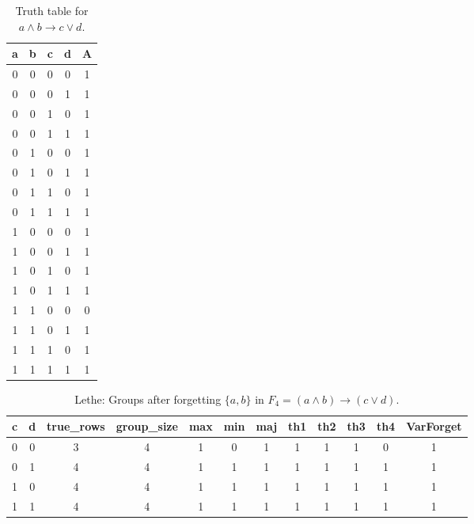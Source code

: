\begin{table}[!tb]
    \centering
    \begin{tabular}{|c|c|c|c|c|}
        \hline
        \textbf{a} & \textbf{b} & \textbf{c} & \textbf{d} & \textbf{A} \\ \hline
        0 & 0 & 0 & 0 & 1 \\ \hline
        0 & 0 & 0 & 1 & 1 \\ \hline
        0 & 0 & 1 & 0 & 1 \\ \hline
        0 & 0 & 1 & 1 & 1 \\ \hline
        0 & 1 & 0 & 0 & 1 \\ \hline
        0 & 1 & 0 & 1 & 1 \\ \hline
        0 & 1 & 1 & 0 & 1 \\ \hline
        0 & 1 & 1 & 1 & 1 \\ \hline
        1 & 0 & 0 & 0 & 1 \\ \hline
        1 & 0 & 0 & 1 & 1 \\ \hline
        1 & 0 & 1 & 0 & 1 \\ \hline
        1 & 0 & 1 & 1 & 1 \\ \hline
        1 & 1 & 0 & 0 & 0 \\ \hline
        1 & 1 & 0 & 1 & 1 \\ \hline
        1 & 1 & 1 & 0 & 1 \\ \hline
        1 & 1 & 1 & 1 & 1 \\ \hline
    \end{tabular}
    \caption{Truth table for $a \land b \rightarrow c \lor d$.}
    \label{tab:truthtab}
\end{table}

\begin{table}[!tb]
    \centering
    \begin{tabular}{|c|c|c|c|c|c|c|c|c|c|c|c|}
        \hline
        \textbf{c} & \textbf{d} & \textbf{true\_rows} & \textbf{group\_size} & \textbf{max} & \textbf{min} & \textbf{maj} & \textbf{th1} & \textbf{th2} & \textbf{th3} & \textbf{th4} & \textbf{VarForget} \\ \hline
        \rowcolor{gray!40} 0 & 0 & 3 & 4 & 1 & 0 & 1 & 1 & 1 & 1 & 0 & 1 \\ \hline
        \rowcolor{blue!40} 0 & 1 & 4 & 4 & 1 & 1 & 1 & 1 & 1 & 1 & 1 & 1 \\ \hline
        \rowcolor{red!40} 1 & 0 & 4 & 4 & 1 & 1 & 1 & 1 & 1 & 1 & 1 & 1 \\ \hline
        \rowcolor{green!40} 1 & 1 & 4 & 4 & 1 & 1 & 1 & 1 & 1 & 1 & 1 & 1 \\ \hline
    \end{tabular}
    \caption{Lethe: Groups after forgetting $\{a, b\}$ in $F_{4} = (a \land b) \rightarrow (c \lor d)$.}
    \label{tab:lethe-F4-ab-groups}
\end{table}
